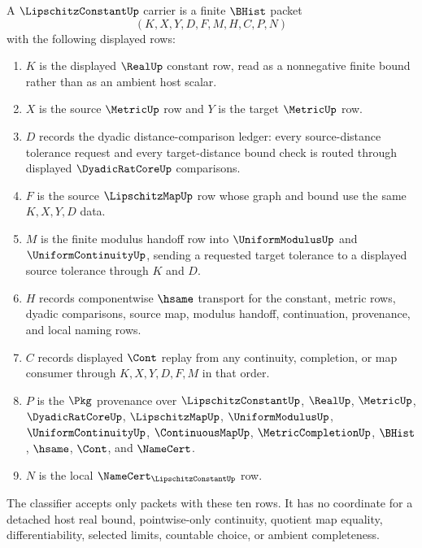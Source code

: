 \begin{definition}\label{def:lipschitz-constant-carrier}
A $\LipschitzConstantUp$ carrier is a finite $\BHist$ packet
$$
(K,X,Y,D,F,M,H,C,P,N)
$$
with the following displayed rows:
\begin{enumerate}
\item $K$ is the displayed $\RealUp$ constant row, read as a nonnegative finite bound rather than as an ambient host scalar.
\item $X$ is the source $\MetricUp$ row and $Y$ is the target $\MetricUp$ row.
\item $D$ records the dyadic distance-comparison ledger: every source-distance tolerance request and every target-distance bound check is routed through displayed $\DyadicRatCoreUp$ comparisons.
\item $F$ is the source $\LipschitzMapUp$ row whose graph and bound use the same $K,X,Y,D$ data.
\item $M$ is the finite modulus handoff row into $\UniformModulusUp$ and $\UniformContinuityUp$, sending a requested target tolerance to a displayed source tolerance through $K$ and $D$.
\item $H$ records componentwise $\hsame$ transport for the constant, metric rows, dyadic comparisons, source map, modulus handoff, continuation, provenance, and local naming rows.
\item $C$ records displayed $\Cont$ replay from any continuity, completion, or map consumer through $K,X,Y,D,F,M$ in that order.
\item $P$ is the $\Pkg$ provenance over $\LipschitzConstantUp$, $\RealUp$, $\MetricUp$, $\DyadicRatCoreUp$, $\LipschitzMapUp$, $\UniformModulusUp$, $\UniformContinuityUp$, $\ContinuousMapUp$, $\MetricCompletionUp$, $\BHist$, $\hsame$, $\Cont$, and $\NameCert$.
\item $N$ is the local $\NameCert_{\LipschitzConstantUp}$ row.
\end{enumerate}
The classifier accepts only packets with these ten rows. It has no coordinate for a detached host real bound, pointwise-only continuity, quotient map equality, differentiability, selected limits, countable choice, or ambient completeness.
\end{definition}

